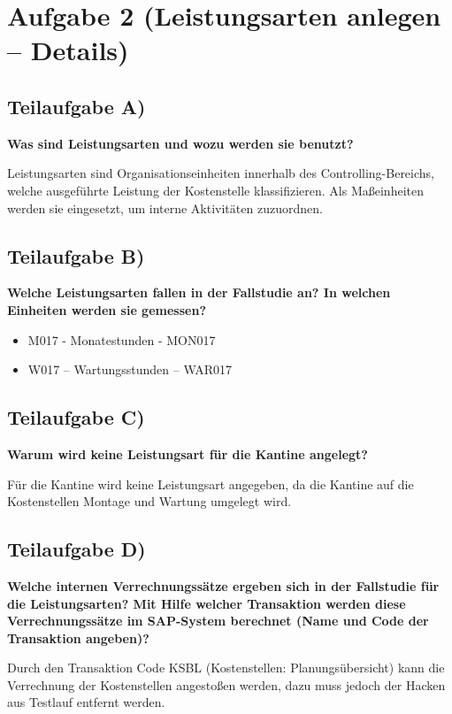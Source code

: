\section{Aufgabe 2 (Leistungsarten anlegen – Details)}


\subsection{Teilaufgabe A)}
\textbf{Was sind Leistungsarten und wozu werden sie benutzt?}

Leistungsarten sind Organisationseinheiten innerhalb des Controlling-Bereichs,
welche ausgeführte Leistung der Kostenstelle klassifizieren. Als Maßeinheiten
werden sie eingesetzt, um interne Aktivitäten zuzuordnen.

\subsection{Teilaufgabe B)}
\textbf{Welche Leistungsarten fallen in der Fallstudie an? In welchen
Einheiten werden sie gemessen?}
\begin{itemize}
  \item M017 - Monatestunden - MON017
  \item W017 – Wartungsstunden – WAR017
\end{itemize}

\subsection{Teilaufgabe C)}
\textbf{Warum wird keine Leistungsart für die Kantine angelegt?}

Für die Kantine wird keine Leistungsart angegeben, da die Kantine auf die
Kostenstellen Montage und Wartung umgelegt wird.

\subsection{Teilaufgabe D)}
\textbf{Welche internen Verrechnungssätze ergeben sich in der Fallstudie für
die Leistungsarten? Mit Hilfe welcher Transaktion werden diese Verrechnungssätze im SAP-System berechnet (Name
und Code der Transaktion angeben)?}

Durch den Transaktion Code KSBL (Kostenstellen: Planungsübersicht) kann die
Verrechnung der Kostenstellen angestoßen werden, dazu muss jedoch der Hacken aus Testlauf entfernt werden.

\clearpage 